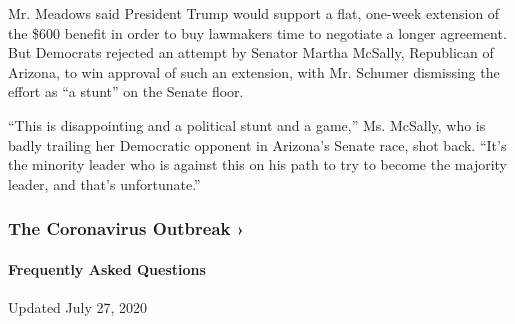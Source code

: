 Mr. Meadows said President Trump would support a flat, one-week
extension of the \$600 benefit in order to buy lawmakers time to
negotiate a longer agreement. But Democrats rejected an attempt by
Senator Martha McSally, Republican of Arizona, to win approval of such
an extension, with Mr. Schumer dismissing the effort as ``a stunt'' on
the Senate floor.

``This is disappointing and a political stunt and a game,'' Ms. McSally,
who is badly trailing her Democratic opponent in Arizona's Senate race,
shot back. ``It's the minority leader who is against this on his path to
try to become the majority leader, and that's unfortunate.''

\href{https://www.nytimes.com/news-event/coronavirus?action=click\&pgtype=Article\&state=default\&region=MAIN_CONTENT_3\&context=storylines_faq}{}

\hypertarget{the-coronavirus-outbreak-}{%
\subsubsection{The Coronavirus Outbreak
›}\label{the-coronavirus-outbreak-}}

\hypertarget{frequently-asked-questions}{%
\paragraph{Frequently Asked
Questions}\label{frequently-asked-questions}}

Updated July 27, 2020

